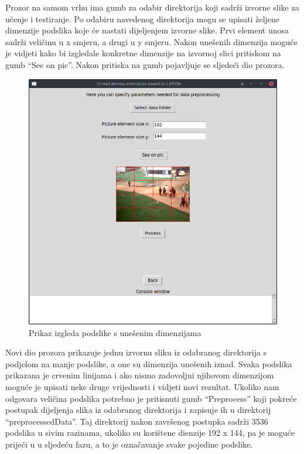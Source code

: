 \documentclass[times, utf8, zavrsni, numeric]{fer}
\begin{document}
\bigbreak

Prozor na samom vrhu ima gumb za odabir direktorija koji sadrži izvorne slike
za učenje i testiranje. Po odabiru navedenog direktorija mogu se upisati 
željene dimenzije podslika koje će nastati dijeljenjem izvorne slike.
Prvi element unosa sadrži veličinu u x smjeru, a drugi u y smjeru. Nakon
unešenih dimenzija moguće je vidjeti kako bi izgledale konkretne dimenzije
na izvornoj slici pritiskom na gumb \enquote{See on pic}. Nakon pritiska na gumb
pojavljuje se sljedeći dio prozora.

\begin{figure}[ht]
\centering
\includegraphics[scale=0.4]{img/seeonpic.png}
\caption{Prikaz izgleda podslike s unešenim dimenzijama}
\end{figure}

Novi dio prozora prikazuje jednu izvornu sliku iz odabranog direktorija
s podjelom na manje podslike, a one su dimenzija unešenih iznad. Svaka podslika
prikazana je crvenim linijama i ako nismo zadovoljni njihovom dimenzijom
moguće je upisati neke druge vrijednosti i vidjeti novi rezultat. Ukoliko 
nam odgovara veličina podslika potrebno je pritisnuti gumb \enquote{Preprocess}
koji pokreće postupak dijeljenja slika iz odabranog direktorija i zapisuje ih u 
direktorij \enquote{preprocessedData}. Taj direktorij nakon završenog postupka
sadrži 3536 podslika u sivim razinama, ukoliko su korištene dienzije 192 x 144, 
pa je moguće prijeći u u sljedeću fazu, a to je označavanje svake pojedine podslike.
\end{document}
